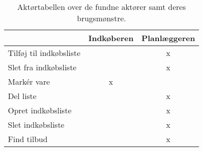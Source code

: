 \begin{table}[H]
\centering
    \begin{tabular}{|l|c|c|}
\hline
        ~                                       & Indkøberen & Planlæggeren  \\ \hline
        Tilføj til indkøbsliste                 & ~          & x             \\ \hline 
        Slet fra indkøbsliste                   & ~          & x             \\ \hline
        Markér vare                             & x          & ~             \\ \hline
        Del liste                               & ~          & x             \\ \hline
        Opret indkøbsliste                      & ~          & x             \\ \hline
        Slet indkøbsliste                       & ~          & x             \\ \hline
        Find tilbud                             & ~          & x             \\ \hline
    \end{tabular}

\caption{Aktørtabellen over de fundne aktører samt deres brugsmønstre.}
\label{tab:Aktoertabel}
\end{table}